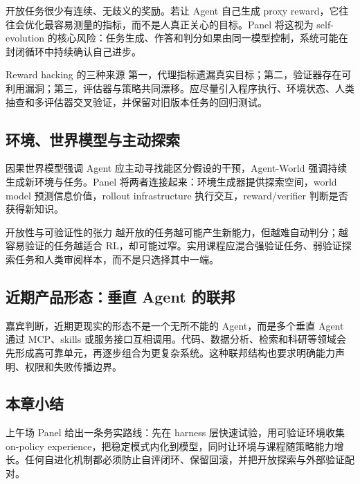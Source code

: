 开放任务很少有连续、无歧义的奖励。若让 Agent 自己生成 proxy reward，它往往会优化最容易测量的指标，而不是人真正关心的目标。Panel 将这视为 self-evolution 的核心风险：任务生成、作答和判分如果由同一模型控制，系统可能在封闭循环中持续确认自己进步。

\begin{warningbox}{Reward hacking 的三种来源}
第一，代理指标遗漏真实目标；第二，验证器存在可利用漏洞；第三，评估器与策略共同漂移。应尽量引入程序执行、环境状态、人类抽查和多评估器交叉验证，并保留对旧版本任务的回归测试。
\end{warningbox}

\subsection{环境、世界模型与主动探索}

因果世界模型强调 Agent 应主动寻找能区分假设的干预，Agent-World 强调持续生成新环境与任务。Panel 将两者连接起来：环境生成器提供探索空间，world model 预测信息价值，rollout infrastructure 执行交互，reward/verifier 判断是否获得新知识。

\begin{importantbox}{开放性与可验证性的张力}
越开放的任务越可能产生新能力，但越难自动判分；越容易验证的任务越适合 RL，却可能过窄。实用课程应混合强验证任务、弱验证探索任务和人类审阅样本，而不是只选择其中一端。
\end{importantbox}

\subsection{近期产品形态：垂直 Agent 的联邦}

嘉宾判断，近期更现实的形态不是一个无所不能的 Agent，而是多个垂直 Agent 通过 MCP、skills 或服务接口互相调用。代码、数据分析、检索和科研等领域会先形成高可靠单元，再逐步组合为更复杂系统。这种联邦结构也要求明确能力声明、权限和失败传播边界。

\subsection{本章小结}

上午场 Panel 给出一条务实路线：先在 harness 层快速试验，用可验证环境收集 on-policy experience，把稳定模式内化到模型，同时让环境与课程随策略能力增长。任何自进化机制都必须防止自评闭环、保留回滚，并把开放探索与外部验证配对。

